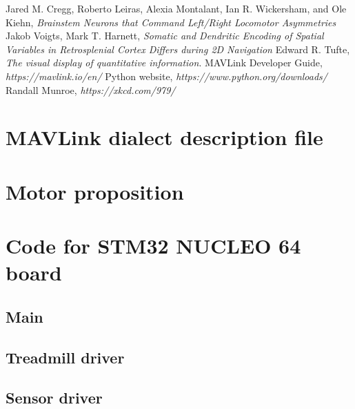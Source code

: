 \documentclass[12pt,a4paper, twoside]{article}
\begin{document}
\newpage
\lhead{ }
\begin{thebibliography}{100}
	
	Jared M. Cregg, Roberto Leiras, Alexia Montalant, Ian R. Wickersham, and Ole Kiehn, \textit{Brainstem Neurons that Command Left/Right Locomotor Asymmetries} 
	 Jakob Voigts, Mark T. Harnett, \textit{Somatic and Dendritic Encoding of Spatial Variables in Retrosplenial Cortex Differs during 2D Navigation}
	 Edward R. Tufte, \textit{The visual display of quantitative information}.
	 MAVLink Developer Guide, \textit{https://mavlink.io/en/}
	 Python website, \textit{https://www.python.org/downloads/}
	 Randall Munroe, \textit{https://xkcd.com/979/}

	
\end{thebibliography}

\listoffigures
\listoftables
\newpage
\appendix
\section{MAVLink dialect description file}\label{app:mavlink}

\section{Motor proposition}\label{app:motor}

\section{Code for STM32 NUCLEO 64 board}
\subsection{Main}


\subsection{Treadmill driver}


\subsection{Sensor driver}


\end{document}

